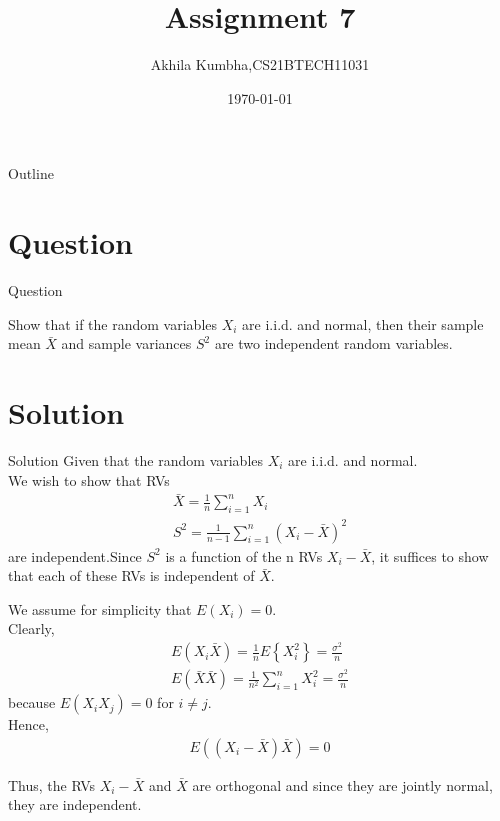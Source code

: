 \documentclass{beamer}
\title{Assignment 7}
\author{Akhila Kumbha,CS21BTECH11031}
\date{\today}
\providecommand{\brak}[1]{\ensuremath{\left(#1\right)}}
\providecommand{\cbrak}[1]{\ensuremath{\left\{#1\right\}}}
\begin{document}
\begin{frame}
    \titlepage 
\end{frame}

\logo{}

\begin{frame}{Outline}
    \tableofcontents
\end{frame}


\section{Question}
\begin{frame}{Question}

Show that if the random variables $X_i$ are i.i.d. and normal, then their sample mean $\bar{X}$ and sample variances $S^2$ are two independent random variables.\\

\end{frame}


\section{Solution}
\begin{frame}{Solution}
Given that the random variables $X_i$ are i.i.d. and normal.\\
We wish to show that RVs
\begin{align}
    \bar{X}=\frac{1}{n} \sum_{i=1}^{n}X_i\\
    S^2=\frac{1}{n-1} \sum_{i=1}^{n} \brak{{X_i}-\bar{X}}^2
\end{align}
are independent.Since $S^2$ is a function of the n RVs $X_i-\bar{X}$, it suffices to show that each of these RVs is independent of $\bar{X}$.
\end{frame} 

\begin{frame}
We assume for simplicity that $E(X_i)=0$.\\Clearly,\\
\begin{align}
  E(X_i\bar{X})=\frac{1}{n}E\cbrak{X_i^2}=\frac{\sigma^2}{n}\\
  E(\bar{X}\bar{X})=\frac{1}{n^2}\sum_{i=1}^{n} X_i^2=\frac{\sigma^2}{n}
\end{align}
because $E(X_iX_j)=0$ for $i\neq j$.\\Hence,
\begin{align}
    E((X_i-\bar{X})\bar{X})=0
\end{align}
\end{frame}
\begin{frame}
Thus, the RVs $X_i-\bar{X}$ and $\bar{X}$ are orthogonal and since they are jointly normal, they are independent.
\end{frame}
\end{document}
